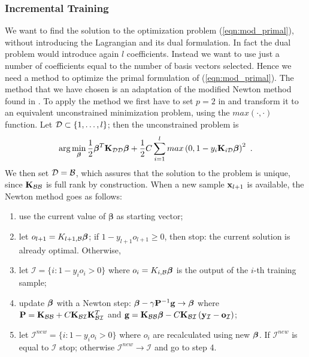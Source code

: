 \subsubsection{Incremental Training}
We want to find the solution to the optimization problem (\ref{eqn:mod_primal}),
without introducing the Lagrangian and its dual formulation. In fact the dual
problem would introduce again $l$ coefficients. Instead we want
to use just a number of coefficients equal to the number of basis vectors selected.
Hence we need a method to optimize the primal formulation of (\ref{eqn:mod_primal}).
The method that we have chosen is an adaptation of the modified Newton method found
in \cite{KeerthiDC05,KeerthiCDC06}. To apply the method we first have to set $p=2$ in
and transform it to an equivalent unconstrained minimization problem,
using the $max(\cdot,\cdot)$ function.
Let $\mathcal{D} \subset \{1,\ldots,l\}$; then the unconstrained problem is
%
\begin{equation}
  \label{eqn:primal}
  \arg \min_{\boldsymbol{\beta}} \frac{1}{2} \boldsymbol{\beta}^T \mathbf{K}_{\mathcal{D}\mathcal{D}} \boldsymbol{\beta}
    + \frac{1}{2} C \sum_{i=1}^l max \left(0,1-y_i \mathbf{K}_{i\mathcal{D}} \boldsymbol{\beta} \right)^2~.
\end{equation}
%
We then set $\mathcal{D} = \mathcal{B}$, which assures that the
solution to the problem is unique, since $\mathbf{K}_{\mathcal{B}\mathcal{B}}$ is full rank by
construction. When a new sample $\mathbf{x}_{l+1}$ is available, the Newton method goes as follows:
%
\begin{enumerate}

   \item use the current value of $\boldsymbol{\beta}$ as starting
     vector;

   \item let $o_{l+1} = K_{l+1,\mathcal{B}} \boldsymbol{\beta}$; if $1-y_{l+1} o_{l+1} \geq 0$,
     then stop: the current solution is already optimal. Otherwise,
   
   \item let $\mathcal{I} = \{ i: 1-y_i o_i>0 \}$ where $o_i =
     K_{i,\mathcal{B}} \boldsymbol{\beta}$ is the output of the $i$-th training sample;

   \item update $\boldsymbol{\beta}$ with a Newton step:
     $\boldsymbol{\beta} - \gamma \mathbf{P}^{-1}\mathbf{g} \rightarrow \boldsymbol{\beta}$ where
     $\mathbf{P} = \mathbf{K}_{\mathcal{B}\mathcal{B}} + C \mathbf{K}_{\mathcal{B}\mathcal{I}} \mathbf{K}_{\mathcal{B}\mathcal{I}}^T$ and
     $\mathbf{g} = \mathbf{K}_{\mathcal{B}\mathcal{B}} \boldsymbol{\beta} - C \mathbf{K}_{\mathcal{B}\mathcal{I}}
        \left( \mathbf{y}_{\mathcal{I}}-\mathbf{o}_{\mathcal{I}}\right)$;
        
   \item let $\mathcal{I}^{new} = \{ i: 1-y_i o_i>0 \}$ where $o_i$ are
     recalculated using new $\boldsymbol{\beta}$. If $\mathcal{I}^{new}$ is equal to
     $\mathcal{I}$ stop; otherwise $\mathcal{I}^{new} \rightarrow \mathcal{I}$
     and go to step 4.

\end{enumerate}
